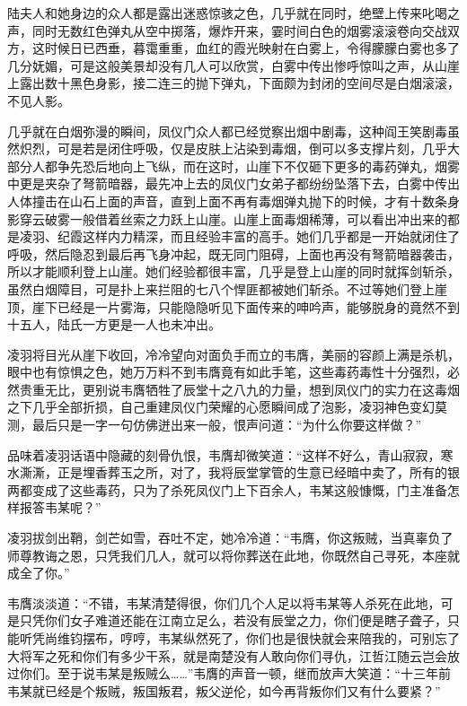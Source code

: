 陆夫人和她身边的众人都是露出迷惑惊骇之色，几乎就在同时，绝壁上传来叱喝之声，同时无数红色弹丸从空中掷落，爆炸开来，霎时间白色的烟雾滚滚卷向交战双方，这时候日已西垂，暮霭重重，血红的霞光映射在白雾上，令得朦朦白雾也多了几分妩媚，可是这般美景却没有几人可以欣赏，白雾中传出惨呼惊叫之声，从山崖上露出数十黑色身影，接二连三的抛下弹丸，下面颇为封闭的空间尽是白烟滚滚，不见人影。

几乎就在白烟弥漫的瞬间，凤仪门众人都已经觉察出烟中剧毒，这种阎王笑剧毒虽然炽烈，可是若是闭住呼吸，仅是皮肤上沾染到毒烟，倒可以多支撑片刻，几乎大部分人都争先恐后地向上飞纵，而在这时，山崖下不仅砸下更多的毒药弹丸，烟雾中更是夹杂了弩箭暗器，最先冲上去的凤仪门女弟子都纷纷坠落下去，白雾中传出人体撞击在山石上面的声音，直到上面不再有毒烟弹丸抛下的时候，才有十数条身影穿云破雾一般借着丝索之力跃上山崖。山崖上面毒烟稀薄，可以看出冲出来的都是凌羽、纪霞这样内力精深，而且经验丰富的高手。她们几乎都是一开始就闭住了呼吸，然后隐忍到最后再飞身冲起，既无同门阻碍，上面也再没有弩箭暗器袭击，所以才能顺利登上山崖。她们经验都很丰富，几乎是登上山崖的同时就挥剑斩杀，虽然白烟障目，可是扑上来拦阻的七八个悍匪都被她们斩杀。不过等她们登上崖顶，崖下已经是一片雾海，只能隐隐听见下面传来的呻吟声，能够脱身的竟然不到十五人，陆氏一方更是一人也未冲出。

凌羽将目光从崖下收回，冷冷望向对面负手而立的韦膺，美丽的容颜上满是杀机，眼中也有惊惧之色，她万万料不到韦膺竟有如此手笔，这些毒药毒性十分强烈，必然贵重无比，更别说韦膺牺牲了辰堂十之八九的力量，想到凤仪门的实力在这毒烟之下几乎全部折损，自己重建凤仪门荣耀的心愿瞬间成了泡影，凌羽神色变幻莫测，最后只是一字一句仿佛迸出来一般，恨声问道：“为什么你要这样做？”

品味着凌羽话语中隐藏的刻骨仇恨，韦膺却微笑道：“这样不好么，青山寂寂，寒水澌澌，正是埋香葬玉之所，对了，我将辰堂掌管的生意已经暗中卖了，所有的银两都变成了这些毒药，只为了杀死凤仪门上下百余人，韦某这般慷慨，门主准备怎样报答韦某呢？”

凌羽拔剑出鞘，剑芒如雪，吞吐不定，她冷冷道：“韦膺，你这叛贼，当真辜负了师尊教诲之恩，只凭我们几人，就可以将你葬送在此地，你既然自己寻死，本座就成全了你。”

韦膺淡淡道：“不错，韦某清楚得很，你们几个人足以将韦某等人杀死在此地，可是只凭你们女子难道还能在江南立足么，若没有辰堂之力，你们便是瞎子聋子，只能听凭尚维钧摆布，哼哼，韦某纵然死了，你们也是很快就会来陪我的，可别忘了大将军之死和你们有多少干系，就是南楚没有人敢向你们寻仇，江哲江随云岂会放过你们。至于说韦某是叛贼么……”韦膺的声音一顿，继而放声大笑道：“十三年前韦某就已经是个叛贼，叛国叛君，叛父逆伦，如今再背叛你们又有什么要紧？”

